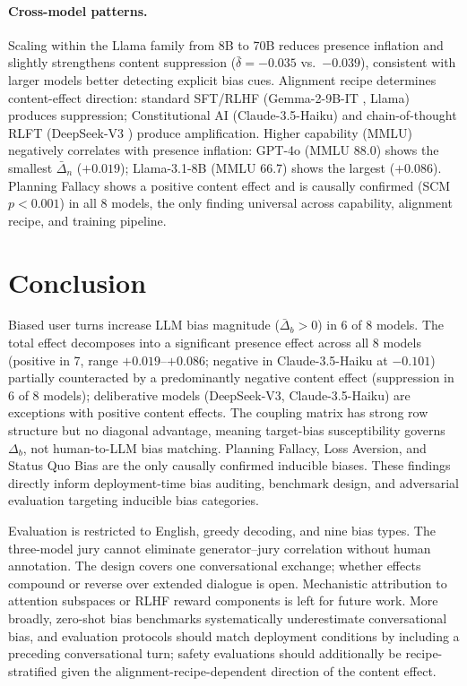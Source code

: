 \documentclass[11pt]{article}
\begin{document}
\paragraph{Cross-model patterns.}
Scaling within the Llama family from 8B to 70B \citep{dubey2024llama} reduces presence inflation and slightly strengthens content suppression ($\bar{\delta}{=}{-0.035}$ vs.\ $-0.039$), consistent with larger models better detecting explicit bias cues. Alignment recipe determines content-effect direction: standard SFT/RLHF \citep{christiano2017deep,ouyang2022training} (Gemma-2-9B-IT \citep{team2024gemma}, Llama) produces suppression; Constitutional AI \citep{bai2022constitutional} (Claude-3.5-Haiku) and chain-of-thought RLFT \citep{wei2022chain} (DeepSeek-V3 \citep{liu2024deepseek}) produce amplification. Higher capability (MMLU) negatively correlates with presence inflation: GPT-4o \citep{achiam2023gpt} (MMLU 88.0) shows the smallest $\bar{\Delta}_n$ ($+0.019$); Llama-3.1-8B (MMLU 66.7) shows the largest ($+0.086$). Planning Fallacy shows a positive content effect and is causally confirmed (SCM $p{<}0.001$) in all 8 models, the only finding universal across capability, alignment recipe, and training pipeline.

\section{Conclusion}

Biased user turns increase LLM bias magnitude ($\bar{\Delta}_b > 0$) in 6 of 8 models. The total effect decomposes into a significant presence effect across all 8 models (positive in 7, range $+0.019$--$+0.086$; negative in Claude-3.5-Haiku at $-0.101$) partially counteracted by a predominantly negative content effect (suppression in 6 of 8 models); deliberative models (DeepSeek-V3, Claude-3.5-Haiku) are exceptions with positive content effects. The coupling matrix has strong row structure but no diagonal advantage, meaning target-bias susceptibility governs $\Delta_b$, not human-to-LLM bias matching. Planning Fallacy, Loss Aversion, and Status Quo Bias are the only causally confirmed inducible biases. These findings directly inform deployment-time bias auditing, benchmark design, and adversarial evaluation targeting inducible bias categories.

Evaluation is restricted to English, greedy decoding, and nine bias types. The three-model jury cannot eliminate generator--jury correlation without human annotation. The design covers one conversational exchange; whether effects compound or reverse over extended dialogue is open. Mechanistic attribution to attention subspaces or RLHF reward components is left for future work. More broadly, zero-shot bias benchmarks systematically underestimate conversational bias, and evaluation protocols should match deployment conditions by including a preceding conversational turn; safety evaluations should additionally be recipe-stratified given the alignment-recipe-dependent direction of the content effect.
\end{document}
